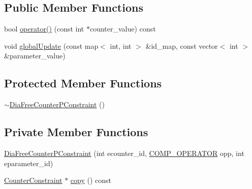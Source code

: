 \subsection*{Public Member Functions}
\begin{DoxyCompactItemize}
\item 
bool \mbox{\hyperlink{classgraphsat_1_1_dia_free_counter_p_constraint_a02255677df41a98992d4150923d3e169}{operator()}} (const int $\ast$counter\+\_\+value) const
\item 
void \mbox{\hyperlink{classgraphsat_1_1_dia_free_counter_p_constraint_a4a0fe8c88aba82f93aa6b78b0af68cc1}{global\+Update}} (const map$<$ int, int $>$ \&id\+\_\+map, const vector$<$ int $>$ \&parameter\+\_\+value)
\end{DoxyCompactItemize}
\subsection*{Protected Member Functions}
\begin{DoxyCompactItemize}
\item 
\mbox{\hyperlink{classgraphsat_1_1_dia_free_counter_p_constraint_aab8266583181e8f12f8d1b4bbede96cb}{$\sim$\+Dia\+Free\+Counter\+P\+Constraint}} ()
\end{DoxyCompactItemize}
\subsection*{Private Member Functions}
\begin{DoxyCompactItemize}
\item 
\mbox{\hyperlink{classgraphsat_1_1_dia_free_counter_p_constraint_a22a0379a03b78ca68b7539befe0409f1}{Dia\+Free\+Counter\+P\+Constraint}} (int ecounter\+\_\+id, \mbox{\hyperlink{namespacegraphsat_acfb5939f9bdafbd9aea0d084b9a56f69}{C\+O\+M\+P\+\_\+\+O\+P\+E\+R\+A\+T\+OR}} opp, int eparameter\+\_\+id)
\item 
\mbox{\hyperlink{classgraphsat_1_1_counter_constraint}{Counter\+Constraint}} $\ast$ \mbox{\hyperlink{classgraphsat_1_1_dia_free_counter_p_constraint_a75e3eccebbe42daf47b10209f6ab0b59}{copy}} () const
\end{DoxyCompactItemize}
